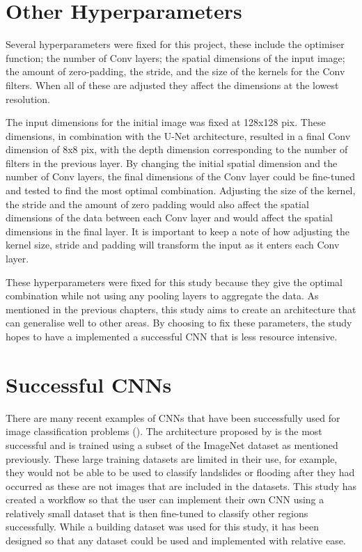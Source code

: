 \section{Other Hyperparameters}
Several hyperparameters were fixed for this project, these include the optimiser function; the number of Conv layers; the spatial dimensions of the input image; the amount of zero-padding, the stride, and the size of the kernels for the Conv filters. When all of these are adjusted they affect the dimensions at the lowest resolution. 
\par
The input dimensions for the initial image was fixed at 128x128 pix. These dimensions, in combination with the U-Net architecture, resulted in a final Conv dimension of 8x8 pix, with the depth dimension corresponding to the number of filters in the previous layer. By changing the initial spatial dimension and the number of Conv layers, the final dimensions of the Conv layer could be fine-tuned and tested to find the most optimal combination. Adjusting the size of the kernel, the stride and the amount of zero padding would also affect the spatial dimensions of the data between each Conv layer and would affect the spatial dimensions in the final layer. It is important to keep a note of how adjusting the kernel size, stride and padding will transform the input as it enters each Conv layer.
\par
These hyperparameters were fixed for this study because they give the optimal combination while not using any pooling layers to aggregate the data. As mentioned in the previous chapters, this study aims to create an architecture that can generalise well to other areas. By choosing to fix these parameters, the study hopes to have a implemented a successful CNN that is less resource intensive. 
\section{Successful CNNs}
There are many recent examples of CNNs that have been successfully used for image classification problems (\cite{audebert18,krizhevsky17, long15, maggiori17a, marmanis16, mnih13, shelhamer17, volpi17}). The architecture proposed by \citet{krizhevsky17} is the most successful and is trained using a subset of the ImageNet dataset as mentioned previously. These large training datasets are limited in their use, for example, they would not be able to be used to classify landslides or flooding after they had occurred as these are not images that are included in the datasets. This study has created a workflow so that the user can implement their own CNN using a relatively small dataset that is then fine-tuned to classify other regions successfully. While a building dataset was used for this study, it has been designed so that any dataset could be used and implemented with relative ease.

